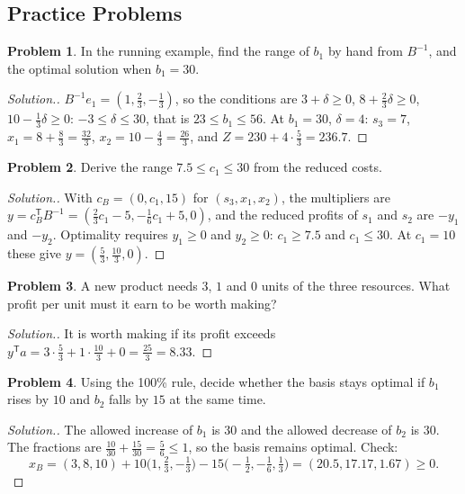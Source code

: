 \documentclass[11pt,a4paper]{article}
\numberwithin{equation}{section}
\theoremstyle{definition}
\newtheorem{problemx}{Problem}[subsection]
\newenvironment{problem}{\begin{problemx}}{\end{problemx}}
\newenvironment{solution}
  {\renewcommand{\qedsymbol}{}\begin{proof}[\textit{Solution}.]}
  {\end{proof}}
\begin{document}
\subsection{Practice Problems}

\begin{problem}
In the running example, find the range of $b_1$ by hand from $B^{-1}$, and the optimal solution when $b_1 = 30$.
\end{problem}

\begin{solution}
$B^{-1}e_1 = (1, \frac23, -\frac13)$, so the conditions are $3 + \delta \geq 0$, $8 + \frac23\delta \geq 0$, $10 - \frac13\delta \geq 0$: $-3 \leq \delta \leq 30$, that is $23 \leq b_1 \leq 56$. At $b_1 = 30$, $\delta = 4$: $s_3 = 7$, $x_1 = 8 + \frac83 = \frac{32}3$, $x_2 = 10 - \frac43 = \frac{26}3$, and
$Z = 230 + 4 \cdot \frac53 = 236.7$.
\end{solution}

\begin{problem}
Derive the range $7.5 \leq c_1 \leq 30$ from the reduced costs.
\end{problem}

\begin{solution}
With $c_B = (0, c_1, 15)$ for $(s_3, x_1, x_2)$, the multipliers are $y = c_B^{\mathsf T}B^{-1} = (\frac23c_1 - 5, -\frac16c_1 + 5, 0)$, and the reduced profits of $s_1$ and $s_2$ are $-y_1$ and $-y_2$. Optimality requires $y_1 \geq 0$ and $y_2 \geq 0$: $c_1 \geq 7.5$ and $c_1 \leq 30$. At $c_1 = 10$ these give
$y = (\frac53, \frac{10}3, 0)$.
\end{solution}

\begin{problem}
A new product needs $3$, $1$ and $0$ units of the three resources. What profit per unit must it earn to be worth making?
\end{problem}

\begin{solution}
It is worth making if its profit exceeds $y^{\mathsf T}a = 3\cdot\frac53 + 1\cdot\frac{10}3 + 0 = \frac{25}3 = 8.33$.
\end{solution}

\begin{problem}
Using the 100\% rule, decide whether the basis stays optimal if $b_1$ rises by $10$ and $b_2$ falls by $15$ at the same time.
\end{problem}

\begin{solution}
The allowed increase of $b_1$ is $30$ and the allowed decrease of $b_2$ is $30$. The fractions are $\frac{10}{30} + \frac{15}{30} = \frac56 \leq 1$, so the basis remains optimal. Check:
\[
x_B = (3, 8, 10) + 10\bigl(1, \tfrac23, -\tfrac13\bigr) - 15\bigl(-\tfrac12, -\tfrac16, \tfrac13\bigr) = (20.5, 17.17, 1.67) \geq 0 .
\]
\end{solution}
\end{document}
